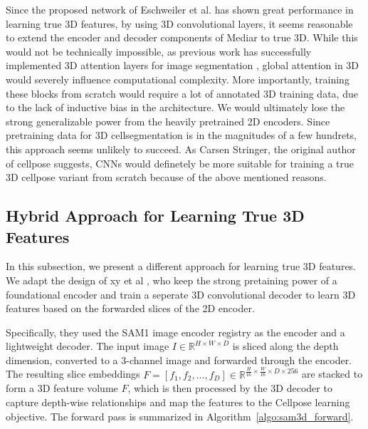 Since the proposed network of Eschweiler et al. has shown great performance in learning true 3D features, by using 3D convolutional layers, it seems reasonable to extend the encoder and decoder components of Mediar to true 3D. While this would not be technically impossible, as previous work has successfully implemented 3D attention layers for image segmentation \cite{Primus}, global attention in 3D would severely influence computational complexity. More importantly, training these blocks from scratch would require a lot of annotated 3D training data, due to the lack of inductive bias in the architecture. We would ultimately lose the strong generalizable power from the heavily pretrained 2D encoders. Since pretraining data for 3D cellsegmentation is in the magnitudes of a few hundrets, this approach seems unlikely to succeed. As Carsen Stringer, the original author of cellpose suggests, CNNs would definetely be more suitable for training a true 3D cellpose variant from scratch because of the above mentioned reasons.

\subsection{Hybrid Approach for Learning True 3D Features}

In this subsection, we present a different approach for learning true 3D features. We adapt the design of xy et al \cite{3dfeautreslicingpaper}, who keep the strong pretaining power of a foundational encoder and train a seperate 3D convolutional decoder to learn 3D features based on the forwarded slices of the 2D encoder.

Specifically, they used the SAM1 image encoder registry as the encoder and a lightweight decoder. The input image
\(
I \in \mathbb{R}^{H \times W \times D}
\) 
is sliced along the depth dimension, converted to a 3-channel image and forwarded through the encoder. The resulting slice embeddings $F = [f_1, f_2, \dots, f_D] \in \mathbb{R}^{\frac{H}{16} \times \frac{W}{16} \times D \times 256}$ are stacked to form a 3D feature volume \(F\), which is then processed by the 3D decoder to capture depth-wise relationships and map the features to the Cellpose learning objective. The forward pass is summarized in Algorithm~\ref{algo:sam3d_forward}.

